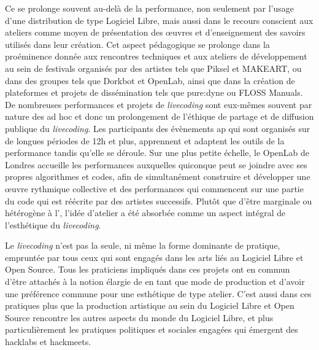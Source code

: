 {Ce  se prolonge souvent
au{}-del\`a de la performance, non seulement par l'usage d'une
distribution de type Logiciel Libre, mais aussi dans le recours
conscient aux ateliers comme moyen de pr\'esentation des {\oe}uvres et
d'enseignement des savoirs utilis\'es dans leur cr\'eation. Cet aspect
p\'edagogique se prolonge dans la pro\'eminence donn\'ee aux rencontres
techniques et aux ateliers de d\'eveloppement au sein de festivals
organis\'es par des artistes tels que Piksel et MAKEART, ou dans des
groupes tels que Dorkbot et OpenLab, ainsi que dans la cr\'eation de
plateformes et projets de diss\'emination tels que pure:dyne ou FLOSS
Manuals. De nombreuses performances et projets de {\em livecoding}
sont eux{}-m\^emes souvent par nature des  ad hoc et donc un
prolongement de l'\'ethique de partage et de diffusion publique du
{\em livecoding}. Les participants des \'ev\`enements ap qui sont
organis\'es sur de longues p\'eriodes de 12h et plus, apprennent et
adaptent les outils de la performance tandis qu'elle se d\'eroule. Sur
une plus petite \'echelle, le OpenLab de Londres accueille les
performances  auxquelles quiconque peut se joindre
avec ses propres algorithmes et codes, afin de simultan\'ement
construire et d\'evelopper une {\oe}uvre rythmique collective et des
performances qui commencent sur une partie du code qui est r\'e\'ecrite
par des artistes successifs. Plut\^ot que d'\^etre marginale ou
h\'et\'erog\`ene \`a l', l'id\'ee d'atelier a \'et\'e absorb\'ee
comme un aspect int\'egral de l'esth\'etique du {\em livecoding}.

Le {\em livecoding} n'est pas la seule, ni m\^eme la forme dominante
de pratique, emprunt\'ee par tous ceux qui sont engag\'es dans les arts
li\'es au Logiciel Libre et Open Source. Tous les praticiens
impliqu\'es dans ces projets ont en commun d'\^etre attach\'es \`a la
notion \'elargie de  en tant que mode de production et
d'avoir une pr\'ef\'erence commune pour une esth\'etique de type
atelier. C'est aussi dans ces pratiques plus  que la
production artistique au sein du Logiciel Libre et Open Source
rencontre les autres aspects du monde du Logiciel Libre, et plus
particuli\`erement les pratiques politiques et sociales engag\'ees qui
\'emergent des hacklabs et hackmeets.


}
